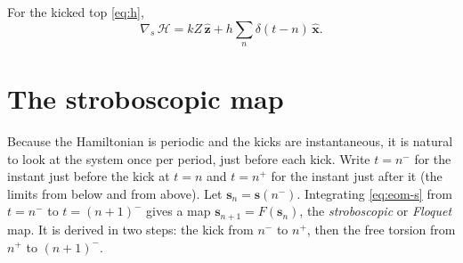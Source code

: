 \documentclass[11pt,a4paper]{article}
\newcommand{\vs}{\bm{s}}
\begin{document}
For the kicked top \eqref{eq:h},
\begin{equation}\label{eq:grad-h}
  \nabla_{\!s}\, \mathcal H = kZ\,\hat{\bm z} + h\sum_n \delta(t-n)\,\hat{\bm x} .
\end{equation}

\section{The stroboscopic map}\label{sec:map}

Because the Hamiltonian is periodic and the kicks are instantaneous, it is natural to look at the system once per
period, just before each kick. Write $t = n^-$ for the instant just before the kick at $t = n$ and $t = n^+$ for the
instant just after it (the limits from below and from above). Let $\vs_n = \vs(n^-)$. Integrating
\eqref{eq:eom-s} from $t=n^-$ to $t=(n+1)^-$ gives a map $\vs_{n+1} = F(\vs_n)$, the \emph{stroboscopic} or
\emph{Floquet} map. It is derived in two steps: the kick from $n^-$ to $n^+$, then the free torsion from $n^+$ to
$(n+1)^-$.
\end{document}
